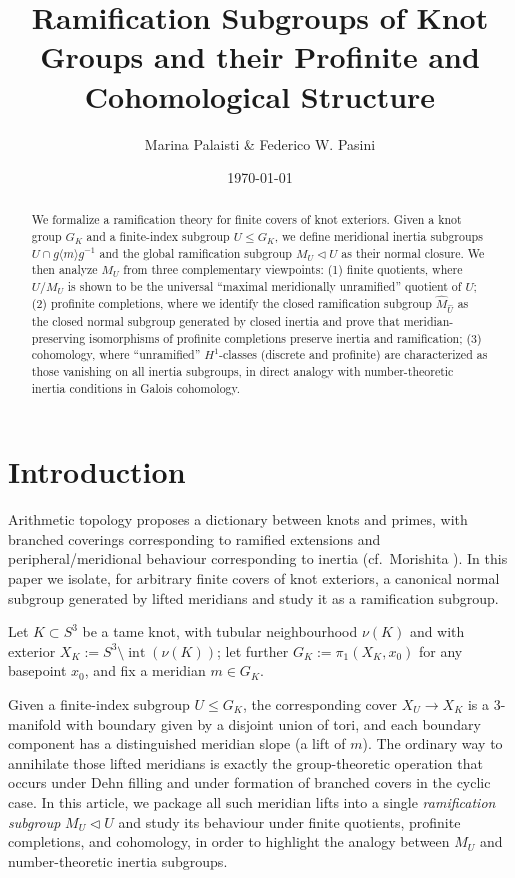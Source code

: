 \documentclass[11pt]{article}
\title{Ramification Subgroups of Knot Groups and their Profinite and Cohomological Structure}
\author{Marina Palaisti \& Federico W. Pasini}
\date{\today}
\begin{document}
	\maketitle
	
	\begin{abstract}
		We formalize a ramification theory for finite covers of knot exteriors. Given a knot group $G_K$ and a finite-index subgroup $U\le G_K$, we define meridional inertia subgroups $U\cap g\langle m\rangle g^{-1}$ and the global ramification subgroup $M_U\triangleleft U$ as their normal closure. We then analyze $M_U$ from three complementary viewpoints:
		(1) finite quotients, where $U/M_U$ is shown to be the universal ``maximal meridionally unramified'' quotient of $U$;
		(2) profinite completions, where we identify the closed ramification subgroup $\widehat M_{\widehat U}$ as the closed normal subgroup generated by closed inertia and prove that meridian-preserving isomorphisms of profinite completions preserve inertia and ramification;
		(3) cohomology, where ``unramified'' $H^1$-classes (discrete and profinite) are characterized as those vanishing on all inertia subgroups, in direct analogy with number-theoretic inertia conditions in Galois cohomology.
	\end{abstract}
	
	\section{Introduction}
	
	Arithmetic topology proposes a dictionary between knots and primes, with branched coverings corresponding to ramified extensions and peripheral/meridional behaviour corresponding to inertia (cf.\ Morishita \cite{Morishita}). In this paper we isolate, for arbitrary finite covers of knot exteriors, a canonical normal subgroup generated by lifted meridians and study it as a ramification subgroup.
	
	Let $K\subset S^3$ be a tame knot, with tubular neighbourhood $\nu(K)$ and with exterior
	$
	X_K := S^3\setminus \operatorname{int}(\nu(K))$; let further $G_K := \pi_1(X_K, x_0)$ for any basepoint $x_0$, and fix a meridian $m\in G_K$.
	
	Given a finite-index subgroup $U\le G_K$, the corresponding cover $X_U\to X_K$ is a 3-manifold with boundary given by a disjoint union of tori, and each boundary component has a distinguished meridian slope (a lift of $m$). The ordinary way to annihilate those lifted meridians is exactly the group-theoretic operation that occurs under Dehn filling and under formation of branched covers in the cyclic case. In this article, we package all such meridian lifts into a single \textit{ramification subgroup} $M_U\triangleleft U$ and study its behaviour under finite quotients, profinite completions, and cohomology, in order to highlight the analogy between $M_U$ and number-theoretic inertia subgroups.
	
\end{document}
